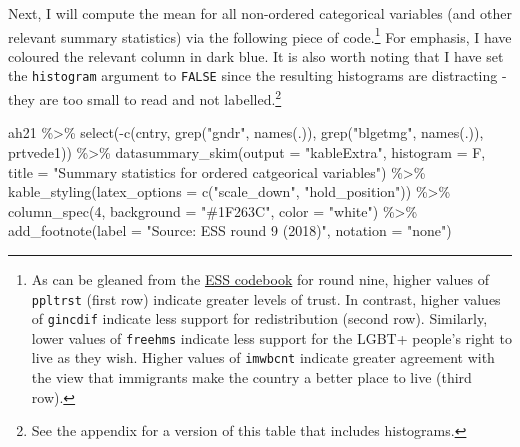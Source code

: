 \documentclass[
]{article}
\newenvironment{Shaded}{\begin{snugshade}}{\end{snugshade}}
\newcommand{\AttributeTok}[1]{\textcolor[rgb]{0.77,0.63,0.00}{#1}}
\newcommand{\DecValTok}[1]{\textcolor[rgb]{0.00,0.00,0.81}{#1}}
\newcommand{\FunctionTok}[1]{\textcolor[rgb]{0.00,0.00,0.00}{#1}}
\newcommand{\NormalTok}[1]{#1}
\newcommand{\SpecialCharTok}[1]{\textcolor[rgb]{0.00,0.00,0.00}{#1}}
\newcommand{\StringTok}[1]{\textcolor[rgb]{0.31,0.60,0.02}{#1}}
\begin{document}
Next, I will compute the mean for all non-ordered categorical variables
(and other relevant summary statistics) via the following piece of
code.\footnote{As can be gleaned from the
  \href{https://ess-search.nsd.no/en/study/bdc7c350-1029-4cb3-9d5e-53f668b8fa74}{ESS
  codebook} for round nine, higher values of \texttt{ppltrst} (first
  row) indicate greater levels of trust. In contrast, higher values of
  \texttt{gincdif} indicate less support for redistribution (second
  row). Similarly, lower values of \texttt{freehms} indicate less
  support for the LGBT+ people's right to live as they wish. Higher
  values of \texttt{imwbcnt} indicate greater agreement with the view
  that immigrants make the country a better place to live (third row).}
For emphasis, I have coloured the relevant column in dark blue. It is
also worth noting that I have set the \texttt{histogram} argument to
\texttt{FALSE} since the resulting histograms are distracting - they are
too small to read and not labelled.\footnote{See the appendix for a
  version of this table that includes histograms.}

\begin{Shaded}
\begin{Highlighting}[]
\NormalTok{ah21 }\SpecialCharTok{\%\textgreater{}\%}
  \FunctionTok{select}\NormalTok{(}\SpecialCharTok{{-}}\FunctionTok{c}\NormalTok{(cntry, }\FunctionTok{grep}\NormalTok{(}\StringTok{"gndr"}\NormalTok{, }\FunctionTok{names}\NormalTok{(.)), }\FunctionTok{grep}\NormalTok{(}\StringTok{"blgetmg"}\NormalTok{, }\FunctionTok{names}\NormalTok{(.)), prtvede1)) }\SpecialCharTok{\%\textgreater{}\%}
  \FunctionTok{datasummary\_skim}\NormalTok{(}\AttributeTok{output =} \StringTok{"kableExtra"}\NormalTok{, }\AttributeTok{histogram =}\NormalTok{ F,}
                   \AttributeTok{title =} \StringTok{"Summary statistics for ordered catgeorical variables"}\NormalTok{) }\SpecialCharTok{\%\textgreater{}\%}
  \FunctionTok{kable\_styling}\NormalTok{(}\AttributeTok{latex\_options =} \FunctionTok{c}\NormalTok{(}\StringTok{"scale\_down"}\NormalTok{, }\StringTok{"hold\_position"}\NormalTok{)) }\SpecialCharTok{\%\textgreater{}\%}
  \FunctionTok{column\_spec}\NormalTok{(}\DecValTok{4}\NormalTok{, }\AttributeTok{background =} \StringTok{"\#1F263C"}\NormalTok{, }\AttributeTok{color =} \StringTok{"white"}\NormalTok{) }\SpecialCharTok{\%\textgreater{}\%}
  \FunctionTok{add\_footnote}\NormalTok{(}\AttributeTok{label =} \StringTok{"Source: ESS round 9 (2018)"}\NormalTok{, }
               \AttributeTok{notation =} \StringTok{"none"}\NormalTok{) }
\end{Highlighting}
\end{Shaded}
\end{document}
